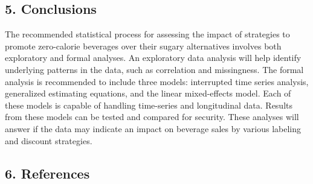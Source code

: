 \documentclass[
]{article}
\begin{document}
\hypertarget{conclusions}{%
\subsection{5. Conclusions}\label{conclusions}}

The recommended statistical process for assessing the impact of
strategies to promote zero-calorie beverages over their sugary
alternatives involves both exploratory and formal analyses. An
exploratory data analysis will help identify underlying patterns in the
data, such as correlation and missingness. The formal analysis is
recommended to include three models: interrupted time series analysis,
generalized estimating equations, and the linear mixed-effects model.
Each of these models is capable of handling time-series and longitudinal
data. Results from these models can be tested and compared for security.
These analyses will answer if the data may indicate an impact on
beverage sales by various labeling and discount strategies.

\hypertarget{references}{%
\subsection{6. References}\label{references}}
\end{document}
